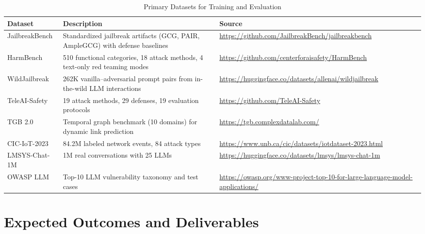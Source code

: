 \documentclass[12pt,a4paper]{article}
\begin{document}
\begin{table}[H]
\centering
\caption{Primary Datasets for Training and Evaluation}
\begin{tabularx}{\textwidth}{@{}lXl@{}}
\toprule
\textbf{Dataset} & \textbf{Description} & \textbf{Source} \\
\midrule
JailbreakBench & Standardized jailbreak artifacts (GCG, PAIR, AmpleGCG) with defense baselines & \url{https://github.com/JailbreakBench/jailbreakbench} \\
\addlinespace
HarmBench & 510 functional categories, 18 attack methods, 4 text-only red teaming modes & \url{https://github.com/centerforaisafety/HarmBench} \\
\addlinespace
WildJailbreak & 262K vanilla--adversarial prompt pairs from in-the-wild LLM interactions & \url{https://huggingface.co/datasets/allenai/wildjailbreak} \\
\addlinespace
TeleAI-Safety & 19 attack methods, 29 defenses, 19 evaluation protocols & \url{https://github.com/TeleAI-Safety} \\
\addlinespace
TGB 2.0 & Temporal graph benchmark (10 domains) for dynamic link prediction & \url{https://tgb.complexdatalab.com/} \\
\addlinespace
CIC-IoT-2023 & 84.2M labeled network events, 84 attack types & \url{https://www.unb.ca/cic/datasets/iotdataset-2023.html} \\
\addlinespace
LMSYS-Chat-1M & 1M real conversations with 25 LLMs & \url{https://huggingface.co/datasets/lmsys/lmsys-chat-1m} \\
\addlinespace
OWASP LLM & Top-10 LLM vulnerability taxonomy and test cases & \url{https://owasp.org/www-project-top-10-for-large-language-model-applications/} \\
\bottomrule
\end{tabularx}
\end{table}

\section{Expected Outcomes and Deliverables}
\end{document}
